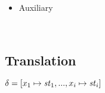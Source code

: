 \begin{itemize}




\item Auxiliary 

\PT{ \Axiom{\usum(\oF) \da \singl\unit}}
\PT{\Axiom{\usum(\oT) \da \emptyv }} \\[1ex]


\end{itemize}


\subsection{Translation}
$\delta = [x_1 \mapsto \mathit{st}_1,..., x_i \mapsto \mathit{st}_i] $

